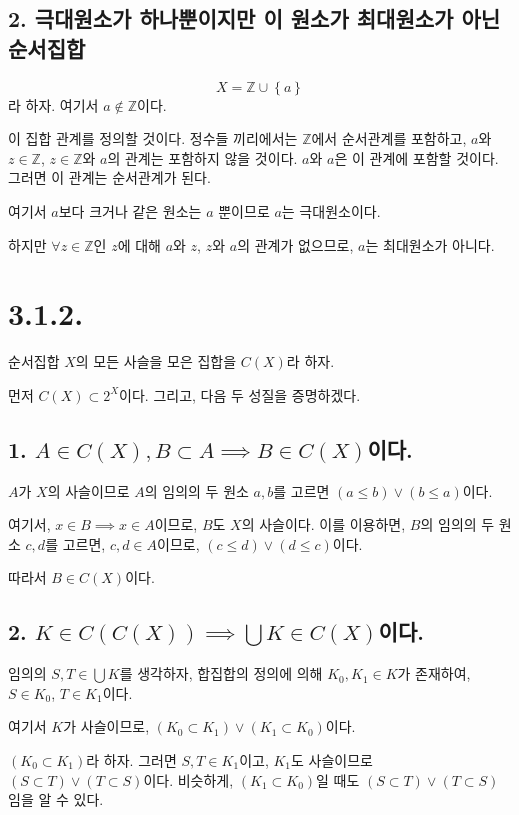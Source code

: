 \documentclass{article}
\begin{document}
\subsection{2. 극대원소가 하나뿐이지만 이 원소가 최대원소가 아닌 순서집합}
$$X = \mathbb{Z} \cup \left\{a\right\}$$ 
라 하자. 여기서 $a \notin \mathbb{Z}$이다. 

이 집합 관계를 정의할 것이다. 정수들 끼리에서는 $\mathbb{Z}$에서 순서관계를 포함하고, $a$와 $z \in \mathbb{Z}$, $z \in \mathbb{Z}$와 $a$의 관계는 포함하지 않을 것이다. $a$와 $a$은 이 관계에 포함할 것이다. 그러면 이 관계는 순서관계가 된다.

여기서 $a$보다 크거나 같은 원소는 $a$ 뿐이므로 $a$는 극대원소이다.

하지만 $\forall z \in \mathbb{Z}$인 $z$에 대해 $a$와 $z$, $z$와 $a$의 관계가 없으므로, $a$는 최대원소가 아니다.

\section{3.1.2.}
순서집합 $X$의 모든 사슬을 모은 집합을 $C(X)$라 하자. 

먼저 $C(X) \subset 2^X$이다. 그리고, 다음 두 성질을 증명하겠다.
\subsection{1. $A \in C(X), B \subset A \implies B \in C(X)$이다.}
$A$가 $X$의 사슬이므로 $A$의 임의의 두 원소 $a, b$를 고르면 $(a \le b) \vee (b \le a)$이다.

여기서, $x \in B \implies x \in A$이므로, $B$도 $X$의 사슬이다. 이를 이용하면,
$B$의 임의의 두 원소 $c, d$를 고르면, $c, d \in A$이므로, $(c \le d) \vee (d \le c)$이다.

따라서 $B \in C(X)$이다.

\subsection{2. $K \in C(C(X)) \implies \bigcup K \in C(X)$이다.}
임의의 $S, T \in \bigcup K$를 생각하자, 합집합의 정의에 의해 $K_0, K_1 \in K$가 존재하여, $S \in K_0$, $T \in K_1$이다.

여기서 $K$가 사슬이므로, $(K_0 \subset K_1) \vee (K_1 \subset K_0)$이다. 

$(K_0 \subset K_1)$라 하자. 그러면 $S, T \in K_1$이고, $K_1$도 사슬이므로 $(S \subset T) \vee (T \subset S)$이다. 비슷하게, $(K_1 \subset K_0)$일 때도 $(S \subset T) \vee (T \subset S)$임을 알 수 있다.
\end{document}
